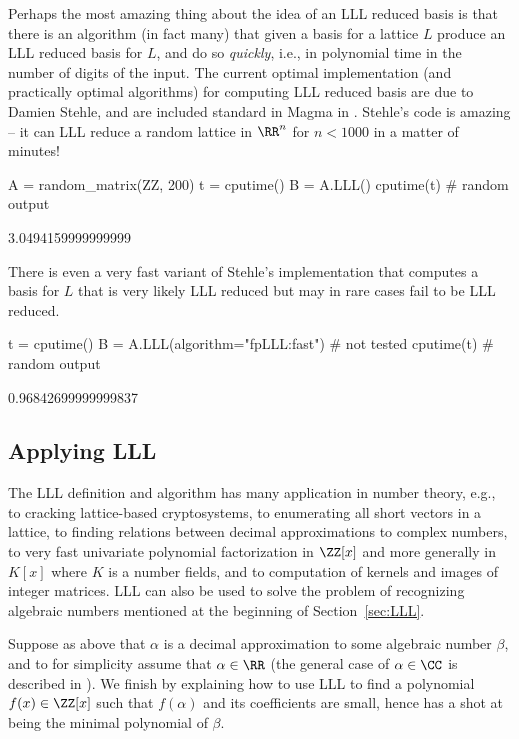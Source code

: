 Perhaps the most amazing thing about the idea of an LLL
reduced basis is that there is an algorithm (in fact many)
that given a basis for a lattice $L$ produce an LLL reduced
basis for $L$, and do so {\em quickly}, i.e., in polynomial
time in the number of digits of the input.   The current
optimal implementation (and practically optimal algorithms)
for computing LLL reduced basis are due to Damien Stehle,
and are included standard in Magma in {\Sage}.   Stehle's code
is amazing -- it can LLL reduce a random lattice in $\RR^{n}$
for $n<1000$ in a matter of minutes!
\begin{sagecode}
\begin{sagecell}
A = random_matrix(ZZ, 200)
t = cputime()
B = A.LLL()
cputime(t)     # random output
\end{sagecell}
\begin{sageout}
3.0494159999999999
\end{sageout}
\end{sagecode} %

\noindent{}There is even a very fast variant of Stehle's implementation that computes a basis for $L$ that is very likely LLL reduced but may in rare
cases fail to be LLL reduced.

\begin{sagecode} %
\begin{sagecell}
t = cputime()
B = A.LLL(algorithm="fpLLL:fast")   # not tested
cputime(t)      # random output
\end{sagecell}
\begin{sageout}
0.96842699999999837
\end{sageout}
\end{sagecode}

\subsection{Applying LLL}

The LLL definition and algorithm has many application in
number theory, e.g., to cracking lattice-based cryptosystems,
to enumerating all short vectors in a lattice, to finding relations
between decimal approximations to complex numbers, to very
fast univariate polynomial factorization in $\ZZ[x]$ and more
generally in $K[x]$ where $K$ is a number fields, and to
computation of kernels and images of integer matrices.  LLL
can also be used to solve the problem of recognizing algebraic
numbers mentioned at the beginning of Section~\ref{sec:LLL}.

Suppose as above that $\alpha$ is a decimal approximation
to some algebraic number $\beta$, and to for simplicity
assume that $\alpha\in\RR$ (the general case of $\alpha \in \CC$
is described in \cite{cohen:course_ant}).
We finish by explaining how to use LLL to find a polynomial
$f(x) \in \ZZ[x]$ such that $f(\alpha)$ and its coefficients
are small, hence has a shot at being the minimal polynomial
of $\beta$.

